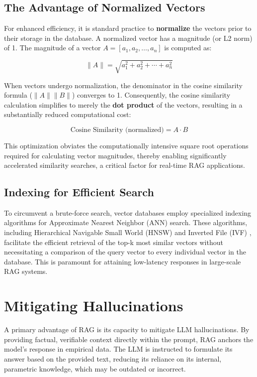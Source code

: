 \subsection{The Advantage of Normalized Vectors}
For enhanced efficiency, it is standard practice to \textbf{normalize} the vectors prior to their storage in the database. A normalized vector has a magnitude (or L2 norm) of 1. The magnitude of a vector \(A = [a_1, a_2, \ldots, a_n]\) is computed as:

\begin{equation}
\|A\| = \sqrt{a_1^2 + a_2^2 + \cdots + a_n^2}
\end{equation}

When vectors undergo normalization, the denominator in the cosine similarity formula (\(\|A\| \|B\|\)) converges to 1. Consequently, the cosine similarity calculation simplifies to merely the \textbf{dot product} of the vectors, resulting in a substantially reduced computational cost:

\begin{equation}
\text{Cosine Similarity (normalized)} = A \cdot B
\end{equation}

This optimization obviates the computationally intensive square root operations required for calculating vector magnitudes, thereby enabling significantly accelerated similarity searches, a critical factor for real-time RAG applications.


\subsection{Indexing for Efficient Search}
To circumvent a brute-force search, vector databases employ specialized indexing algorithms for Approximate Nearest Neighbor (ANN) search. These algorithms, including Hierarchical Navigable Small World (HNSW) \autocite{hnsw_malkov_2018} and Inverted File (IVF) \autocite{ivf_zobel}, facilitate the efficient retrieval of the top-k most similar vectors without necessitating a comparison of the query vector to every individual vector in the database. This is paramount for attaining low-latency responses in large-scale RAG systems.

\section{Mitigating Hallucinations}
A primary advantage of RAG is its capacity to mitigate LLM hallucinations. By providing factual, verifiable context directly within the prompt, RAG anchors the model's response in empirical data. The LLM is instructed to formulate its answer based on the provided text, reducing its reliance on its internal, parametric knowledge, which may be outdated or incorrect.

